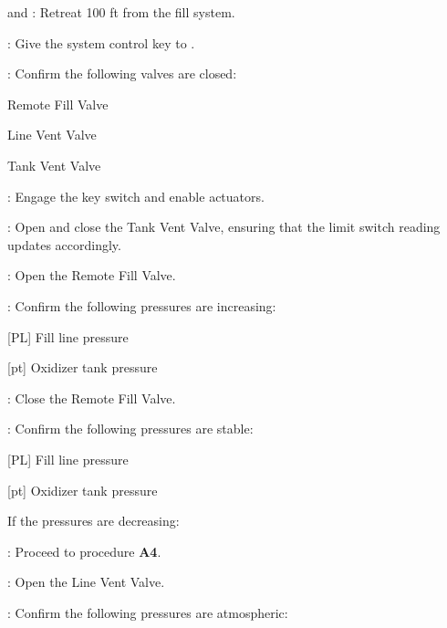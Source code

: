 \begin{checklist}
    \item \primary{} and \secondary{}: Retreat 100 ft from the fill system.
    \item \ops{}: Give the system control key to \control{}.
    \item \control{}: Confirm the following valves are closed:
    \begin{checklist}
        \item Remote Fill Valve
        \item Line Vent Valve
        \item Tank Vent Valve
    \end{checklist}
    \item \control{}: Engage the key switch and enable actuators.
    \item \control{}: Open and close the Tank Vent Valve, ensuring that the limit switch reading updates accordingly.
    \item \control{}: Open the Remote Fill Valve.
    \item \control{}: Confirm the following pressures are increasing:
    \begin{checklist}
        \item {[PL]} Fill line pressure
        \item {[pt]} Oxidizer tank pressure
    \end{checklist}
    \item \control{}: Close the Remote Fill Valve.
    \item \control{}: Confirm the following pressures are stable:
    \begin{checklist}
        \item {[PL]} Fill line pressure
        \item {[pt]} Oxidizer tank pressure
    \end{checklist}
    \begin{checklist}[label=$\bullet$]
        \item If the pressures are decreasing:
        \begin{checklist}
            \item \ops{}: Proceed to procedure \textbf{A4}.
        \end{checklist}
    \end{checklist}
    \item \control{}: Open the Line Vent Valve.
    \item \control{}: Confirm the following pressures are atmospheric:
    \begin{checklist}

\end{checklist}
\end{checklist}
